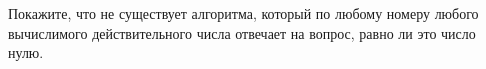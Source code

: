 Покажите, что не существует алгоритма, который по любому номеру любого вычислимого действительного числа
отвечает на вопрос, равно ли это число нулю.
